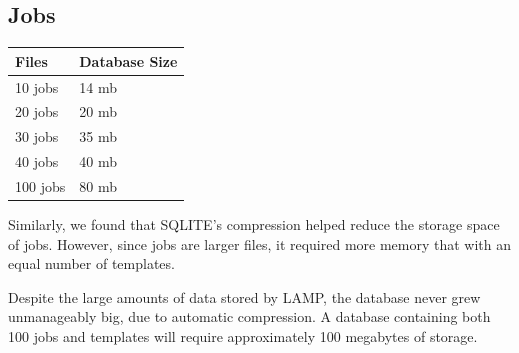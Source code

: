 \documentclass[oneside,openany,11pt,a4paper]{report}
\begin{document}
\subsection{Jobs}

\begin{longtable}{|p{5cm}|p{5cm}|}
	\hline
	\rowcolor{gray!50}
	\textbf{Files} & \textbf{Database Size}   \\ \hline
	
	10 jobs & 14 mb  \\ \hline
	20 jobs & 20 mb  \\ \hline
	30 jobs & 35 mb  \\ \hline
	40 jobs & 40 mb  \\ \hline
	100 jobs & 80 mb  \\ \hline
	
\end{longtable}

Similarly, we found that SQLITE's compression helped reduce the storage space of jobs. However, since jobs are larger files, it required more memory that with an equal number of templates.


Despite the large amounts of data stored by LAMP, the database never grew unmanageably big, due to automatic compression. A database containing both 100 jobs and templates will require approximately 100 megabytes of storage.
\end{document}

